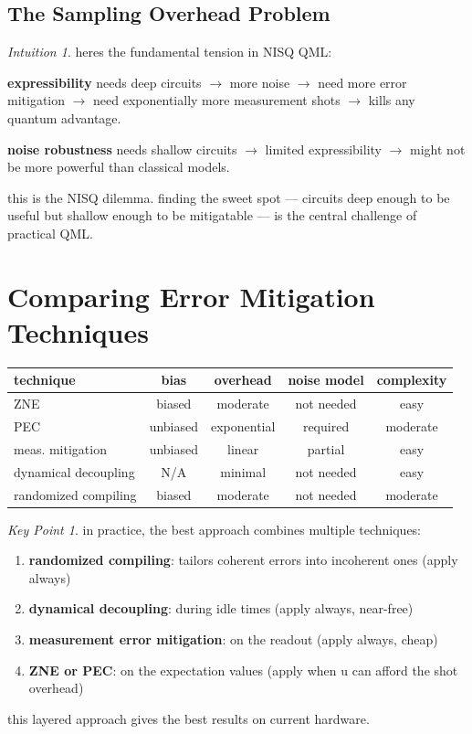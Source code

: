 \documentclass[11pt,a4paper]{article}
\theoremstyle{definition}
\theoremstyle{remark}
\newtheorem*{intuition}{Intuition}
\newtheorem*{keypoint}{Key Point}
\begin{document}
\subsection{The Sampling Overhead Problem}

\begin{intuition}
heres the fundamental tension in NISQ QML:

\textbf{expressibility} needs deep circuits $\to$ more noise $\to$ need more error mitigation $\to$ need exponentially more measurement shots $\to$ kills any quantum advantage.

\textbf{noise robustness} needs shallow circuits $\to$ limited expressibility $\to$ might not be more powerful than classical models.

this is the NISQ dilemma. finding the sweet spot --- circuits deep enough to be useful but shallow enough to be mitigatable --- is the central challenge of practical QML.
\end{intuition}

\section{Comparing Error Mitigation Techniques}

\begin{center}
\begin{tabular}{l|c|c|c|c}
technique & bias & overhead & noise model & complexity \\
\hline
ZNE & biased & moderate & not needed & easy \\
PEC & unbiased & exponential & required & moderate \\
meas. mitigation & unbiased & linear & partial & easy \\
dynamical decoupling & N/A & minimal & not needed & easy \\
randomized compiling & biased & moderate & not needed & moderate
\end{tabular}
\end{center}

\begin{keypoint}
in practice, the best approach combines multiple techniques:
\begin{enumerate}
    \item \textbf{randomized compiling}: tailors coherent errors into incoherent ones (apply always)
    \item \textbf{dynamical decoupling}: during idle times (apply always, near-free)
    \item \textbf{measurement error mitigation}: on the readout (apply always, cheap)
    \item \textbf{ZNE or PEC}: on the expectation values (apply when u can afford the shot overhead)
\end{enumerate}
this layered approach gives the best results on current hardware.
\end{keypoint}
\end{document}
